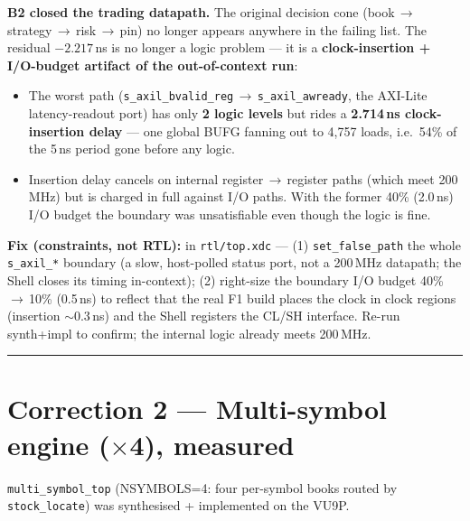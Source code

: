 \documentclass[10pt,a4paper]{article}
\begin{document}
\noindent\textbf{B2 closed the trading datapath.} The original decision cone
(book\,$\rightarrow$\,strategy\,$\rightarrow$\,risk\,$\rightarrow$\,pin) no longer
appears anywhere in the failing list. The residual $-2.217$\,ns is no longer a
logic problem --- it is a \textbf{clock-insertion + I/O-budget artifact of the
out-of-context run}:

\begin{itemize}\itemsep2pt
  \item The worst path (\texttt{s\_axil\_bvalid\_reg}\,$\rightarrow$\,\texttt{s\_axil\_awready},
  the AXI-Lite latency-readout port) has only \textbf{2 logic levels} but rides
  a \textbf{2.714\,ns clock-insertion delay} --- one global BUFG fanning out to
  4{,}757 loads, i.e.\ 54\% of the 5\,ns period gone before any logic.
  \item Insertion delay cancels on internal register\,$\rightarrow$\,register
  paths (which meet 200\,MHz) but is charged in full against I/O paths. With the
  former 40\% (2.0\,ns) I/O budget the boundary was unsatisfiable even though the
  logic is fine.
\end{itemize}

\noindent\textbf{Fix (constraints, not RTL):} in \texttt{rtl/top.xdc} ---
(1) \texttt{set\_false\_path} the whole \texttt{s\_axil\_*} boundary (a slow,
host-polled status port, not a 200\,MHz datapath; the Shell closes its timing
in-context); (2) right-size the boundary I/O budget 40\%\,$\rightarrow$\,10\%
(0.5\,ns) to reflect that the real F1 build places the clock in clock regions
(insertion $\sim$0.3\,ns) and the Shell registers the CL/SH interface. Re-run
synth+impl to confirm; the internal logic already meets 200\,MHz.

\textcolor{rulegray}{\rule{\linewidth}{1pt}}

\section*{Correction 2 --- Multi-symbol engine ($\times$4), measured}

\texttt{multi\_symbol\_top} (NSYMBOLS=4: four per-symbol books routed by
\texttt{stock\_locate}) was synthesised + implemented on the VU9P.
\end{document}
